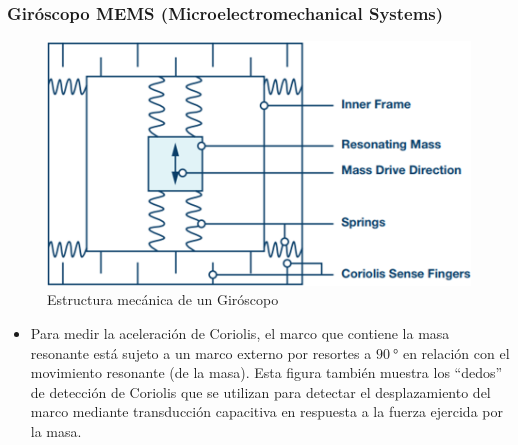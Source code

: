 \begin{frame}
    \frametitle{Giróscopo MEMS (Microelectromechanical Systems)}
    \scriptsize

    \begin{figure}[!h]
        \centering
        \includegraphics[width=0.5\columnwidth]{images/gyroscope_mems_structure.png}
        \caption{Estructura mecánica de un Giróscopo}
    \end{figure}

    \begin{itemize}
        \item Para medir la aceleración de Coriolis, el marco que contiene la masa resonante está sujeto a un marco externo por resortes a $\SI{90}{\degree}$ en relación con el movimiento resonante (de la masa). Esta figura también muestra los ``dedos'' de detección de Coriolis que se utilizan para detectar el desplazamiento del marco mediante transducción capacitiva en respuesta a la fuerza ejercida por la masa.
    \end{itemize}
\end{frame}

